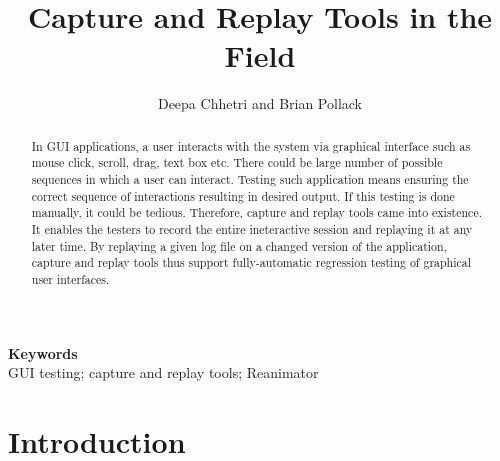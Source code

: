 \documentclass[12pt,journal]{IEEEtran}
\providecommand{\keywords}[1]{\textbf{Keywords} #1}
\begin{document}
\title{Capture and Replay Tools in the Field}
\author{Deepa Chhetri and Brian Pollack}
\maketitle

\begin{abstract}
In GUI applications, a user interacts with the system via graphical interface such as mouse click, scroll, drag, text box etc. There could be large number of possible sequences in which a user can interact. Testing such application means ensuring the correct sequence of interactions resulting in desired output. If this testing is done manually, it could be tedious. Therefore, capture and replay tools came into existence. It  enables the testers to record the entire ineteractive session and replaying it at any later time. By replaying a given log file on a changed version of the application, capture and replay tools thus support fully-automatic regression testing of graphical user interfaces.
\end{abstract}

\keywords\\{GUI testing; capture and replay tools; Reanimator}

\section{Introduction}
\end{document}
